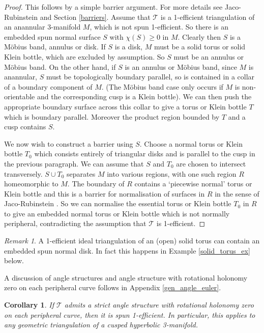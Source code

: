 \documentclass[12pt,reqno]{amsart}  %
\newtheorem{cor}[thm]{Corollary}
\theoremstyle{definition}
\theoremstyle{remark}
\newtheorem{rmk}[thm]{Remark}
\newcommand{\T}{\mathcal{T}}
\begin{document}
\begin{proof} 
This follows by a simple barrier argument. For more details see 
Jaco-Rubinstein \cite{JR} and Section \ref{barriers}. Assume that $\T$ 
is a 1-efficient triangulation of an anannular 3-manifold $M$, which is 
not spun 1-efficient. So there is an embedded spun normal surface $S$ 
with $\chi(S)\ge 0$ in $M$. Clearly then $S$ is a M\"obius band, annulus 
or disk. If $S$ is a disk, $M$ must be a solid torus or solid Klein bottle, 
which are excluded by assumption. So $S$ must be an annulus or M\"obius band. 
On the other hand, if $S$ is an annulus or M\"obius band, since $M$ is 
anannular, $S$ must be topologically boundary parallel, so is contained in 
a collar of a boundary component of $M$. (The M\"obius band case only occurs 
if $M$ is non-orientable and the corresponding cusp is a Klein bottle).
We can then push the appropriate boundary surface across this collar to 
give a torus or Klein bottle $T$ which is boundary parallel. Moreover the 
product region bounded by $T$ and a cusp contains $S$. 

We now wish to construct a barrier using $S$. Choose a normal torus or 
Klein bottle $T_0$ which consists entirely of triangular disks and is 
parallel to the cusp in the previous paragraph. We can assume that $S$ 
and $T_0$ are chosen to intersect transversely.  $S \cup T_0$ separates 
$M$ into various regions, with one such region $R$ homeomorphic to $M$. 
The boundary of $R$ contains a `piecewise normal' torus or Klein bottle 
and this is a barrier for normalisation of surfaces in $R$ in the sense 
of Jaco-Rubinstein \cite{JR}. So we can normalise the essential torus or 
Klein bottle $T_0$ in $R$ to give an embedded normal torus or Klein bottle 
which is not normally peripheral, contradicting  the assumption that $\T$ 
is 1-efficient. 
\end{proof}

\begin{rmk}
A 1-efficient ideal triangulation of an (open) solid torus can contain an 
embedded spun normal disk. In fact this happens in 
Example \ref{solid_torus_ex} below. 
\end{rmk}

A discussion of angle structures and angle structure with rotational 
holonomy zero on each peripheral curve follows in 
Appendix \ref{gen_angle_euler}.

\begin{cor}
If $\T$ admits a strict angle structure with rotational holonomy zero on 
each peripheral curve, then it is spun 1-efficient. In particular, this 
applies to any geometric triangulation of a cusped hyperbolic 3-manifold. 
\end{cor}
\end{document}
